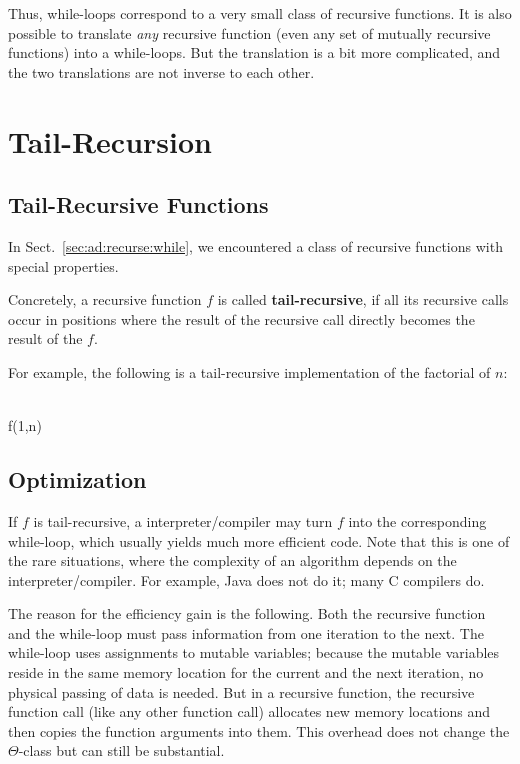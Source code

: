 Thus, while-loops correspond to a very small class of recursive functions.
It is also possible to translate \emph{any} recursive function (even any set of mutually recursive functions) into a while-loops.
But the translation is a bit more complicated, and the two translations are not inverse to each other.

\section{Tail-Recursion}\label{sec:ad:recurse:tail}

\subsection{Tail-Recursive Functions}

In Sect.~\ref{sec:ad:recurse:while}, we encountered a class of recursive functions with special properties.

Concretely, a recursive function $f$ is called \textbf{tail-recursive}, if all its recursive calls occur in positions where the result of the recursive call directly becomes the result of the $f$.

For example, the following is a tail-recursive implementation of the factorial of $n$:
\begin{acode}
\\
f(1,n)
\end{acode}

\subsection{Optimization}

If $f$ is tail-recursive, a interpreter/compiler may turn $f$ into the corresponding while-loop, which usually yields much more efficient code.
Note that this is one of the rare situations, where the complexity of an algorithm depends on the interpreter/compiler.
For example, Java does not do it; many C compilers do.

The reason for the efficiency gain is the following.
Both the recursive function and the while-loop must pass information from one iteration to the next.
The while-loop uses assignments to mutable variables; because the mutable variables reside in the same memory location for the current and the next iteration, no physical passing of data is needed.
But in a recursive function, the recursive function call (like any other function call) allocates new memory locations and then copies the function arguments into them.
This overhead does not change the $\Theta$-class but can still be substantial.

